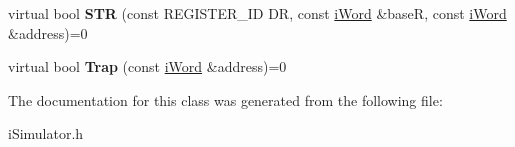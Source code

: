 \begin{DoxyCompactItemize}
\item 
\hypertarget{classiSimulator_aec50c2cc4b7fc2429bfa62ddc79d41df}{
virtual bool {\bfseries STR} (const REGISTER\_\-ID DR, const \hyperlink{classiWord}{iWord} \&baseR, const \hyperlink{classiWord}{iWord} \&address)=0}
\label{classiSimulator_aec50c2cc4b7fc2429bfa62ddc79d41df}

\item 
\hypertarget{classiSimulator_a9ddfcfe7f0c1d563193b096e1058e388}{
virtual bool {\bfseries Trap} (const \hyperlink{classiWord}{iWord} \&address)=0}
\label{classiSimulator_a9ddfcfe7f0c1d563193b096e1058e388}

\end{DoxyCompactItemize}


The documentation for this class was generated from the following file:\begin{DoxyCompactItemize}
\item 
iSimulator.h\end{DoxyCompactItemize}
